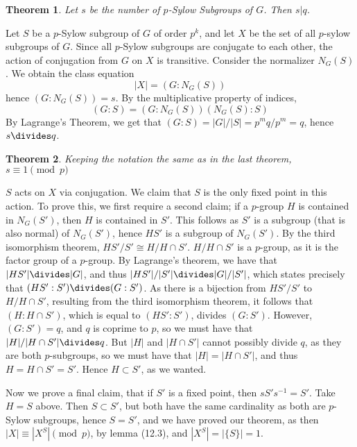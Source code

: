 \documentclass[12pt]{amsbook}
\makeatletter
\theoremstyle{plain}
\newtheorem{theorem}{Theorem}[chapter]
\theoremstyle{definition}
\renewenvironment{proof}[1][\proofname]{\par
  \pushQED{\qed}%
  \normalfont \topsep6\p@\@plus6\p@\relax
  \list{}{\leftmargin=0em
          \rightmargin=\leftmargin
          \settowidth{\itemindent}{\itshape#1}%
          \labelwidth=\itemindent}

  \item[\hskip\labelsep
        \itshape
    #1\@addpunct{.}]\ignorespaces
}{%
  \popQED\endlist\@endpefalse
}
\makeatother
\begin{document}
\begin{theorem}
    Let $s$ be the number of $p$-Sylow Subgroups of $G$. Then $s | q$.
\end{theorem}
\begin{proof}
    Let $S$ be a $p$-Sylow subgroup of $G$ of order $p^k$, and let $X$ be the set of all $p$-sylow subgroups of $G$. Since all $p$-Sylow subgroups are conjugate to each other, the action of conjugation from $G$ on $X$ is transitive. Consider the normalizer $N_G(S)$. We obtain the class equation
    \[ |X| = (G:N_G(S)) \]
    hence $(G:N_G(S)) = s$. By the multiplicative property of indices,
    \[ (G:S) = (G:N_G(S))(N_G(S):S) \]
    By Lagrange's Theorem, we get that $(G:S) = |G|/|S| = p^mq/p^m = q$, hence $s \divides q$.
\end{proof}

\begin{theorem}
Keeping the notation the same as in the last theorem, $s \equiv 1 \pmod{p}$
\end{theorem}
\begin{proof}
    $S$ acts on $X$ via conjugation. We claim that $S$ is the only fixed point in this action. To prove this, we first require a second claim; if a $p$-group $H$ is contained in $N_G(S')$, then $H$ is contained in $S'$. This follows as $S'$ is a subgroup (that is also normal) of $N_G(S')$, hence $HS'$ is a subgroup of $N_G(S')$. By the third isomorphism theorem, $HS'/S' \cong H/H \cap S'$. $H/H \cap S'$ is a $p$-group, as it is the factor group of a $p$-group.  By Lagrange's theorem, we have that $|HS'| \divides |G|$, and thus $|HS'|/|S'| \divides |G|/|S'|$, which states precisely that $(HS':S') \divides (G:S')$. As there is a bijection from $HS'/S'$ to $H/H \cap S'$, resulting from the third isomorphism theorem, it follows that $(H:H \cap S')$, which is equal to $(HS':S')$, divides $(G:S')$. However, $(G:S') = q$, and $q$ is coprime to $p$, so we must have that $|H|/|H \cap S'| \divides q$. But $|H|$ and $|H \cap S'|$ cannot possibly divide $q$, as they are both $p$-subgroups, so we must have that $|H| = |H \cap S'|$, and thus $H = H \cap S' = S'$. Hence $H \subset S'$, as we wanted.

    Now we prove a final claim, that if $S'$ is a fixed point, then $sS's^{-1} = S'$. Take $H=S$ above. Then $S \subset S'$, but both have the same cardinality as both are $p$-Sylow subgroups, hence $S = S'$, and we have proved our theorem, as then $|X| \equiv |X^S| \pmod{p}$, by lemma (12.3), and $|X^S| = |\{S\}| = 1$.
\end{proof}
\end{document}
